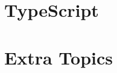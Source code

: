 \documentclass[oneside]{book}
\begin{document}
\chapter{TypeScript}
\chapter{Extra Topics\hfill }
\end{document}
